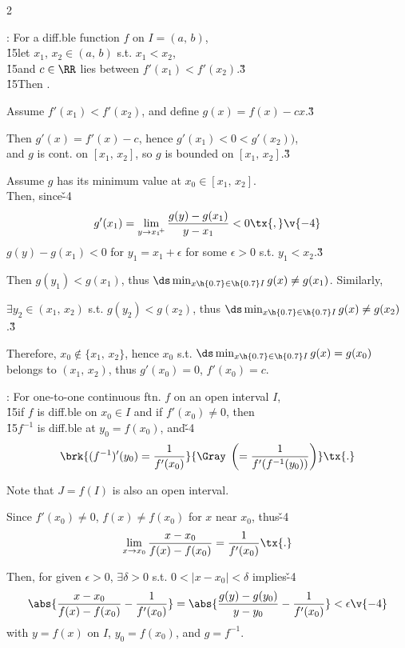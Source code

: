\documentclass[dvipdfmx,a4paper,titlepage,9pt]{jsarticle}
\begin{document}
\begin{multicols*}{2}

: For a diff.ble function $f$ on $I=(a,\,b)$,\\
\h{15}let $x_1$, $x_2\in(a,\,b)$ s.t. $x_1<x_2$,\\
\h{15}and $c\in\RR$ lies between $f'(x_1)<f'(x_2)$.\v3\\
\h{15}Then .

\begin{Pfbox}
Assume $f'(x_1)<f'(x_2)$, and define $g(x)=f(x)-cx$.\v3

Then $g'(x)=f'(x)-c$, hence $g'(x_1)<0<g'(x_2))$,\\
and $g$ is cont. on $[x_1,\,x_2]$, so $g$ is bounded on $[x_1,\,x_2]$.\v3

Assume $g$ has its minimum value at $x_0\in[x_1,\,x_2]$.\\
Then, since\v{-4}
$$g'(x_1)=\lim_{y\to {x_1}\!^+}\frac{g(y)-g(x_1)}{y-x_1}<0\tx{,}\v{-4}$$
$g(y)-g(x_1)<0$ for $y_1=x_1+\epsilon$ for some $\epsilon>0$ s.t. $y_1<x_2$.\v3

Then $g(y_1)<g(x_1)$, thus $\ds\min_{x\h{0.7}\in\h{0.7}I} g(x)\neq g(x_1)$. Similarly,

$\exists y_2\in(x_1,\,x_2)$ s.t. $g(y_2)<g(x_2)$, thus $\ds\min_{x\h{0.7}\in\h{0.7}I} g(x)\neq g(x_2)$.\v3

Therefore, $x_0\notin\{x_1,\,x_2\}$, hence $x_0$ s.t. $\ds\min_{x\h{0.7}\in\h{0.7}I} g(x)=g(x_0)$ belongs to $(x_1,\,x_2)$, thus $g'(x_0)=0$, $f'(x_0)=c$.
\end{Pfbox}

\vfill\null\columnbreak


: For one-to-one continuous ftn. $f$ on an open interval $I$,\\
\h{15}if $f$ is diff.ble on $x_0\in I$ and if $f'(x_0)\neq0$, then\\
\h{15}$f^{-1}$ is diff.ble at $y_0=f(x_0)$, and\v{-4}
$$\brk{(f^{-1})'(y_0)=\frac1{f'(x_0)}}{\Gray\;\left(=\frac1{f'(f^{-1}(y_0))}\right)}\tx{.}$$

\begin{Pfbox}
Note that $J=f(I)$ is also an open interval.

Since $f'(x_0)\neq0$, $f(x)\neq f(x_0)$ for $x$ near $x_0$, thus\v{-4}
$$\lim_{x\to x_0}\frac{x-x_0}{f(x)-f(x_0)}=\frac1{f'(x_0)}\tx{.}$$

Then, for given $\epsilon>0$, $\exists \delta>0$ s.t. $0<|x-x_0|<\delta$ implies\v{-4}
$$\abs{\frac{x-x_0}{f(x)-f(x_0)}-\frac1{f'(x_0)}}=\abs{\frac{g(y)-g(y_0)}{y-y_0}-\frac1{f'(x_0)}}<\epsilon\v{-4}$$
with $y=f(x)$ on $I$, $y_0=f(x_0)$, and $g=f^{-1}$.


\end{Pfbox}
\end{multicols*}
\end{document}
